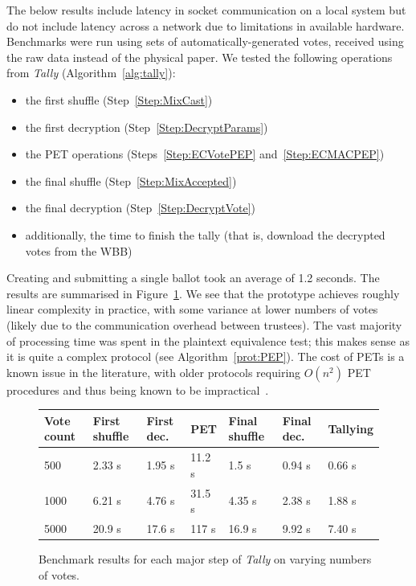 \documentclass[12pt,a4paper]{article}
\theoremstyle{definition}
\begin{document}
The below results include latency in socket communication on a local system but do not include latency across a network due to limitations in available hardware. Benchmarks were run using sets of automatically-generated votes, received using the raw data instead of the physical paper. We tested the following operations from \textit{Tally} (Algorithm~\ref{alg:tally}):

\begin{itemize}
    \item the first shuffle (Step~\ref{Step:MixCast})
    \item the first decryption (Step~\ref{Step:DecryptParams})
    \item the PET operations (Steps~\ref{Step:ECVotePEP} and~\ref{Step:ECMACPEP})
    \item the final shuffle (Step~\ref{Step:MixAccepted})
    \item the final decryption (Step~\ref{Step:DecryptVote})
    \item additionally, the time to finish the tally (that is, download the decrypted votes from the WBB)
\end{itemize}

Creating and submitting a single ballot took an average of 1.2 seconds. The results are summarised in Figure~\ref{fig:benchmarks}. We see that the prototype achieves roughly linear complexity in practice, with some variance at lower numbers of votes (likely due to the communication overhead between trustees). The vast majority of processing time was spent in the plaintext equivalence test; this makes sense as it is quite a complex protocol (see Algorithm~\ref{prot:PEP}). The cost of PETs is a known issue in the literature, with older protocols requiring $O(n^2)$ PET procedures and thus being known to be impractical~\cite{juels2010coercion}.
\begin{figure}
        \begin{tabular}{l|llllll}
        Vote count & First shuffle & First dec. & PET & Final shuffle & Final dec. & Tallying \\ \hline
        500             & 2.33 s             & 1.95 s                & 11.2 s   & 1.5 s              & 0.94 s                & 0.66 s        \\
        1000            & 6.21 s             & 4.76 s                & 31.5 s   & 4.35 s             & 2.38 s                & 1.88 s        \\
        5000            & 20.9 s             & 17.6 s                & 117 s    & 16.9 s             & 9.92 s                & 7.40 s       
        \end{tabular}
    \centering
    \caption{Benchmark results for each major step of \textit{Tally} on varying numbers of votes.}
    \label{fig:benchmarks}
\end{figure}
\end{document}
